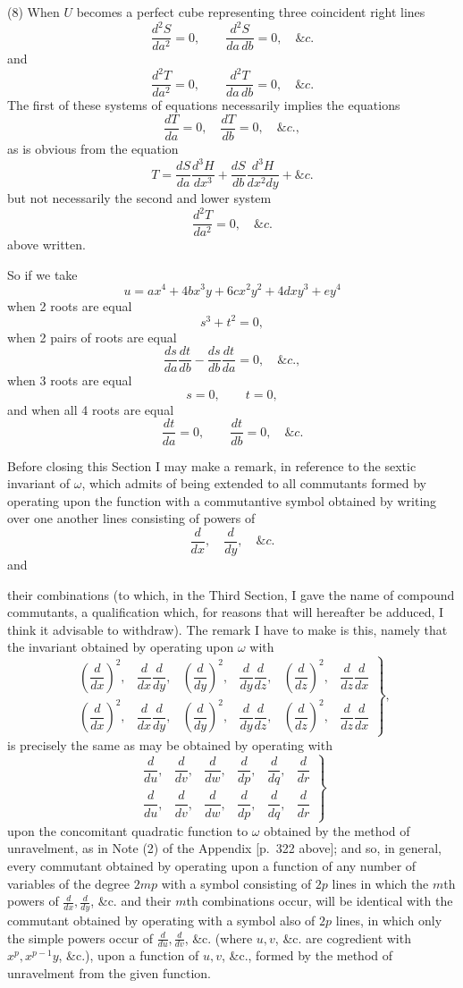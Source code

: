 \documentclass[11pt]{article}
\newcommand{\sourcepage}[1]{\marginpar{\scriptsize p.~#1}}
\begin{document}
(8) When $U$ becomes a perfect cube representing three coincident right lines
\[
\frac{d^2S}{da^2}=0,\qquad \frac{d^2S}{da\,db}=0,\quad \&c.
\]
and
\[
\frac{d^2T}{da^2}=0,\qquad \frac{d^2T}{da\,db}=0,\quad \&c.
\]
The first of these systems of equations necessarily implies the equations
\[
\frac{dT}{da}=0,\quad \frac{dT}{db}=0,\quad \&c.,
\]
as is obvious from the equation
\[
T=\frac{dS}{da}\frac{d^3H}{dx^3}
+\frac{dS}{db}\frac{d^3H}{dx^2dy}+\&c.
\]
but not necessarily the second and lower system
\[
\frac{d^2T}{da^2}=0,\quad \&c.
\]
above written.

So if we take
\[
u=ax^4+4bx^3y+6cx^2y^2+4dxy^3+ey^4
\]
when 2 roots are equal
\[
s^3+t^2=0,
\]
when 2 pairs of roots are equal
\[
\frac{ds}{da}\frac{dt}{db}-\frac{ds}{db}\frac{dt}{da}=0,\quad \&c.,
\]
when 3 roots are equal
\[
s=0,\qquad t=0,
\]
and when all 4 roots are equal
\[
\frac{dt}{da}=0,\qquad \frac{dt}{db}=0,\quad \&c.
\]

Before closing this Section I may make a remark, in reference to the sextic invariant of $\omega$, which admits of being extended to all commutants formed by operating upon the function with a commutantive symbol obtained by writing over one another lines consisting of powers of
\[
\frac{d}{dx},\quad \frac{d}{dy},\quad \&c.
\]
and

\sourcepage{337}
their combinations (to which, in the Third Section, I gave the name of compound commutants, a qualification which, for reasons that will hereafter be adduced, I think it advisable to withdraw). The remark I have to make is this, namely that the invariant obtained by operating upon $\omega$ with
\[
\left.
\begin{matrix}
\left(\dfrac{d}{dx}\right)^2,&\dfrac{d}{dx}\dfrac{d}{dy},&
\left(\dfrac{d}{dy}\right)^2,&\dfrac{d}{dy}\dfrac{d}{dz},&
\left(\dfrac{d}{dz}\right)^2,&\dfrac{d}{dz}\dfrac{d}{dx}\\
\left(\dfrac{d}{dx}\right)^2,&\dfrac{d}{dx}\dfrac{d}{dy},&
\left(\dfrac{d}{dy}\right)^2,&\dfrac{d}{dy}\dfrac{d}{dz},&
\left(\dfrac{d}{dz}\right)^2,&\dfrac{d}{dz}\dfrac{d}{dx}
\end{matrix}
\right\},
\]
is precisely the same as may be obtained by operating with
\[
\left.
\begin{matrix}
\dfrac{d}{du},&\dfrac{d}{dv},&\dfrac{d}{dw},&
\dfrac{d}{dp},&\dfrac{d}{dq},&\dfrac{d}{dr}\\
\dfrac{d}{du},&\dfrac{d}{dv},&\dfrac{d}{dw},&
\dfrac{d}{dp},&\dfrac{d}{dq},&\dfrac{d}{dr}
\end{matrix}
\right\}
\]
upon the concomitant quadratic function to $\omega$ obtained by the method of unravelment, as in Note (2) of the Appendix [p.~322 above]; and so, in general, every commutant obtained by operating upon a function of any number of variables of the degree $2mp$ with a symbol consisting of $2p$ lines in which the $m$th powers of $\frac{d}{dx},\frac{d}{dy}$, \&c. and their $m$th combinations occur, will be identical with the commutant obtained by operating with a symbol also of $2p$ lines, in which only the simple powers occur of $\frac{d}{du},\frac{d}{dv}$, \&c. (where $u,v$, \&c. are cogredient with $x^p,x^{p-1}y$, \&c.), upon a function of $u,v$, \&c., formed by the method of unravelment from the given function.
\end{document}
